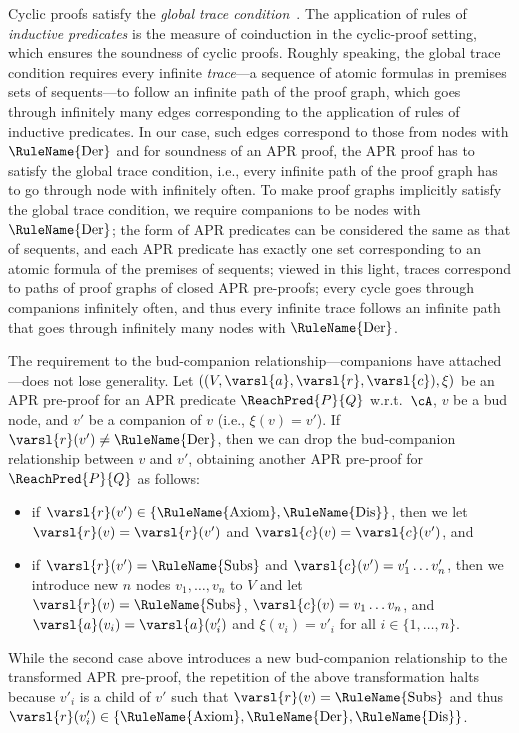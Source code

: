 Cyclic proofs satisfy the \emph{global trace condition}~\cite{Bro05}.
The application of rules of \emph{inductive predicates} is the measure of coinduction in the cyclic-proof setting, which ensures the soundness of cyclic proofs.
Roughly speaking, the global trace condition requires every infinite \emph{trace}---a sequence of atomic formulas in premises sets of sequents---to follow an infinite path of the proof graph, which goes through infinitely many edges corresponding to the application of rules of inductive predicates.
In our case, such edges correspond to those from nodes with $\mbox{\rm\RuleName{Der}}$ and for soundness of an APR proof, the APR proof has to satisfy the global trace condition, i.e., every infinite path of the proof graph has to go through node with  infinitely often.
To make proof graphs implicitly satisfy the global trace condition, we require companions to be nodes with $\mbox{\rm\RuleName{Der}}$;
the form of APR predicates can be considered the same as that of sequents, and each APR predicate has exactly one set corresponding to an atomic formula of the premises of sequents;
viewed in this light, traces correspond to paths of proof graphs of closed APR pre-proofs;
every cycle goes through companions infinitely often, and thus every infinite trace follows an infinite path that goes through infinitely many nodes with $\mbox{\rm\RuleName{Der}}$.

The requirement to the bud-companion relationship---companions have  attached---does not lose generality.
Let $((V,\varsl{a},\varsl{r},\varsl{c}),\xi)$ be an APR pre-proof for an APR predicate $\ReachPred{P}{Q}$ w.r.t.\ $\cA$, $v$ be a bud node, and $v'$ be a companion of $v$ (i.e., $\xi(v)=v'$).
If $\varsl{r}(v') \ne \mbox{\rm\RuleName{Der}}$, then we can drop the bud-companion relationship between $v$ and $v'$, obtaining another APR pre-proof for $\ReachPred{P}{Q}$ as follows:
\begin{itemize}
	\item if $\varsl{r}(v') \in \{\mbox{\rm\RuleName{Axiom}}, \mbox{\rm\RuleName{Dis}}\}$, then we let
	      $\varsl{r}(v) = \varsl{r}(v')$ and $\varsl{c}(v)=\varsl{c}(v')$,
	      and
	\item if $\varsl{r}(v')=\mbox{\rm\RuleName{Subs}}$ and $\varsl{c}(v')=v'_1\ldots v'_n$, then
	      we introduce new $n$ nodes $v_1,\ldots,v_n$ to $V$ and let
	      $\varsl{r}(v) = \mbox{\rm\RuleName{Subs}}$,
	      $\varsl{c}(v)=v_1\ldots v_n$,
	      and
	      $\varsl{a}(v_i) = \varsl{a}(v'_i)$ and $\xi(v_i)=v'_i$ for all $i \in \{1,\ldots,n\}$.
\end{itemize}
While the second case above introduces a new bud-companion relationship to the transformed APR pre-proof, the repetition of the above transformation halts because $v'_i$ is a child of $v'$ such that $\varsl{r}(v)=\mbox{\rm\RuleName{Subs}}$ and thus $\varsl{r}(v'_i) \in  \{\mbox{\rm\RuleName{Axiom}},\mbox{\rm\RuleName{Der}},\mbox{\rm\RuleName{Dis}}\}$.

